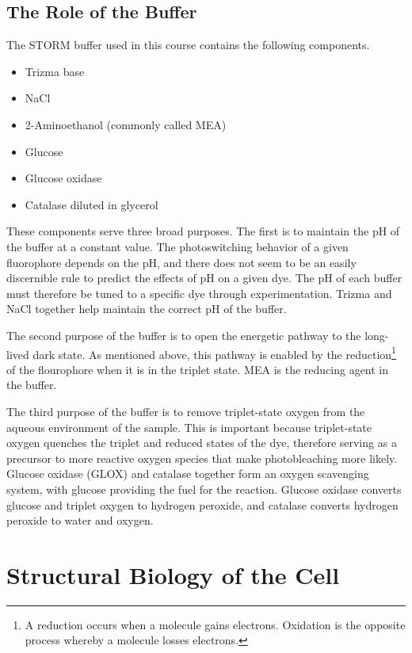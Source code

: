 \documentclass[10pt,a4paper,oneside]{book}
\begin{document}
\section{The Role of the Buffer}

The STORM buffer used in this course contains the following components.

\begin{itemize}
    \item Trizma base
    \item NaCl
    \item 2-Aminoethanol (commonly called MEA)
    \item Glucose
    \item Glucose oxidase
    \item Catalase diluted in glycerol
\end{itemize}

These components serve three broad purposes. The first is to maintain the pH of the buffer at a constant value. The photoswitching behavior of a given fluorophore depends on the pH, and there does not seem to be an easily discernible rule to predict the effects of pH on a given dye. The pH of each buffer must therefore be tuned to a specific dye through experimentation. Trizma and NaCl together help maintain the correct pH of the buffer.

The second purpose of the buffer is to open the energetic pathway to the long-lived dark state. As mentioned above, this pathway is enabled by the reduction\footnote{A reduction occurs when a molecule gains electrons. Oxidation is the opposite process whereby a molecule losses electrons.} of the flourophore when it is in the triplet state. MEA is the reducing agent in the buffer.

The third purpose of the buffer is to remove triplet-state oxygen from the aqueous environment of the sample. This is important because triplet-state oxygen quenches the triplet and reduced states of the dye, therefore serving as a precursor to more reactive oxygen species that make photobleaching more likely. Glucose oxidase (GLOX) and catalase together form an oxygen scavenging system, with glucose providing the fuel for the reaction. Glucose oxidase converts glucose and triplet oxygen to hydrogen peroxide, and catalase converts hydrogen peroxide to water and oxygen.

\chapter{Structural Biology of the Cell}
\end{document}
